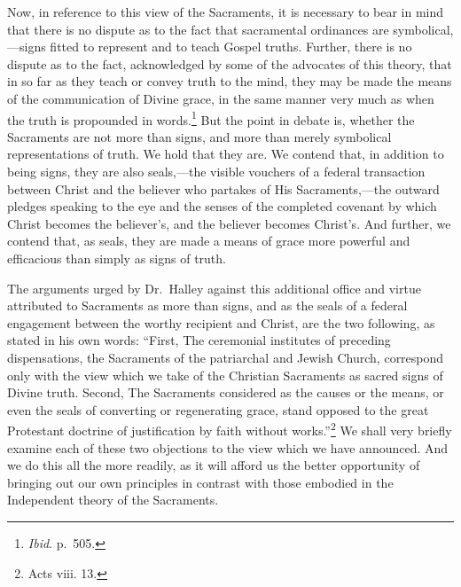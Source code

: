 \documentclass[]{book}
\begin{document}
Now, in reference to this view of the Sacraments, it is necessary to bear in mind that there is no dispute as to the fact that sacramental ordinances are symbolical,---signs fitted to represent and to teach Gospel truths. Further, there is no dispute as to the fact, acknowledged by some of the advocates of this theory, that in so far as they teach or convey truth to the mind, they may be made the means of the communication of Divine grace, in the same manner very much as when the truth is propounded in words.\footnote{\emph{Ibid}. p.~505.} But the point in debate is, whether the Sacraments are not more than signs, and more than merely symbolical representations of truth. We hold that they are. We contend that, in addition to being signs, they are also seals,---the visible vouchers of a federal transaction between Christ and the believer who partakes of His Sacraments,---the outward pledges speaking to the eye and the senses of the completed covenant by which Christ becomes the believer's, and the believer becomes Christ's. And further, we contend that, as seals, they are made a means of grace more powerful and efficacious than simply as signs of truth.

The arguments urged by Dr.~Halley against this additional office and virtue attributed to Sacraments as more than signs, and as the seals of a federal engagement between the worthy recipient and Christ, are the two following, as stated in his own words: ``First, The ceremonial institutes of preceding dispensations, the Sacraments of the patriarchal and Jewish Church, correspond only with the view which we take of the Christian Sacraments as sacred signs of Divine truth. Second, The Sacraments considered as the causes or the means, or even the seals of converting or regenerating grace, stand opposed to the great Protestant doctrine of justification by faith without works.''\footnote{Acts viii. 13.} We shall very briefly examine each of these two objections to the view which we have announced. And we do this all the more readily, as it will afford us the better opportunity of bringing out our own principles in contrast with those embodied in the Independent theory of the Sacraments.
\end{document}
